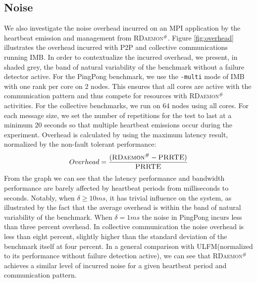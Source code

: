 \documentclass[sigconf]{acmart}
\newcommand{\prrte}[0]{\textsc{PRRTE}\xspace}
\newcommand{\ulfm}[0]{\textsc{ULFM}\xspace}
\newcommand{\ourwork}[0]{\textsc{RDaemon}\ensuremath{^\#}\xspace}
\newcommand{\imb}[0]{\textsc{IMB}\xspace}
\begin{document}
\subsection{Noise}
We also investigate the noise overhead incurred on an MPI application by the heartbeat emission
and management from \ourwork.
Figure \ref{fig:overhead} illustrates the overhead incurred with P2P and collective communications running \imb.
In order to contextualize the incurred overhead, we present, in shaded grey, the band of natural variability
of the benchmark without a failure detector active.
For the PingPong benchmark, we use the \texttt{-multi} mode of IMB with one rank per core on 2 nodes.
This ensures that all cores are active with the communication pattern and thus
compete for resources with \ourwork activities.
For the collective benchmarks, we run on 64 nodes using all cores. For each message size, we set the number of
repetitions for the test to last at a minimum 20 seconds so that multiple heartbeat emissions occur during the experiment. Overhead is calculated by using the maximum latency result, normalized by the non-fault tolerant performance:
\begin{equation}
Overhead = \frac{( {\ourwork - \prrte} )}{\prrte}
\end{equation}
 From the graph we can see that the latency performance and bandwidth performance are barely affected by heartbeat periods from milliseconds to seconds. Notably, when $ \delta \geq 10 ms $, it has trivial influence on the system, as illustrated by the fact that the average overhead is within the band of natural variability of the benchmark. When  $ \delta = 1 ms $ the noise in PingPong incurs less than three percent overhead. In collective communication the noise overhead is less than eight percent, slightly higher than the standard deviation of the benchmark itself at four percent.
 In a general comparison with \ulfm (normalized to its performance without failure detection active),
 we can see that \ourwork achieves a similar level of incurred noise for a given
 heartbeat period and communication pattern.
\end{document}
